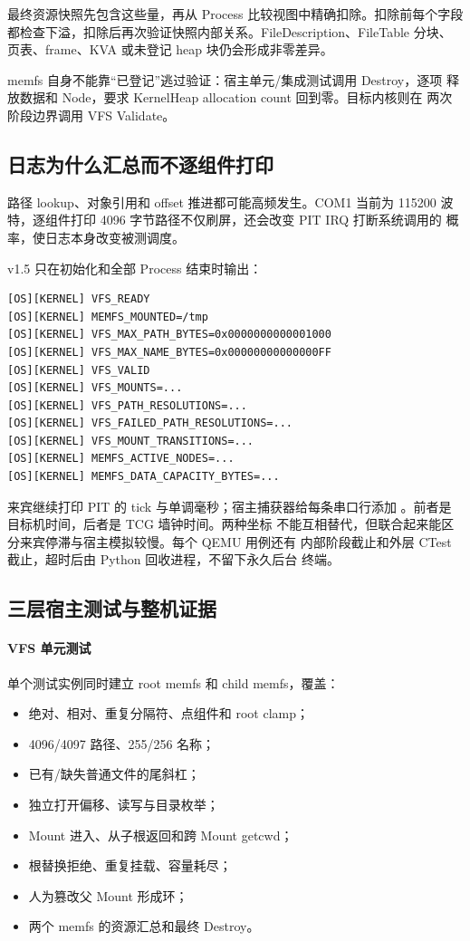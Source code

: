 最终资源快照先包含这些量，再从 Process 比较视图中精确扣除。扣除前每个字段
都检查下溢，扣除后再次验证快照内部关系。FileDescription、FileTable 分块、
页表、frame、KVA 或未登记 heap 块仍会形成非零差异。

memfs 自身不能靠“已登记”逃过验证：宿主单元/集成测试调用 Destroy，逐项
释放数据和 Node，要求 KernelHeap allocation count 回到零。目标内核则在
两次阶段边界调用 VFS Validate。

\subsection{日志为什么汇总而不逐组件打印}

路径 lookup、对象引用和 offset 推进都可能高频发生。COM1 当前为 115200
波特，逐组件打印 4096 字节路径不仅刷屏，还会改变 PIT IRQ 打断系统调用的
概率，使日志本身改变被测调度。

v1.5 只在初始化和全部 Process 结束时输出：

\begin{lstlisting}[caption={VFS 的有界阶段日志}]
[OS][KERNEL] VFS_READY
[OS][KERNEL] MEMFS_MOUNTED=/tmp
[OS][KERNEL] VFS_MAX_PATH_BYTES=0x0000000000001000
[OS][KERNEL] VFS_MAX_NAME_BYTES=0x00000000000000FF
[OS][KERNEL] VFS_VALID
[OS][KERNEL] VFS_MOUNTS=...
[OS][KERNEL] VFS_PATH_RESOLUTIONS=...
[OS][KERNEL] VFS_FAILED_PATH_RESOLUTIONS=...
[OS][KERNEL] VFS_MOUNT_TRANSITIONS=...
[OS][KERNEL] MEMFS_ACTIVE_NODES=...
[OS][KERNEL] MEMFS_DATA_CAPACITY_BYTES=...
\end{lstlisting}

来宾继续打印 PIT 的 tick 与单调毫秒；宿主捕获器给每条串口行添加
\code{[QEMU][T+...ms]}。前者是目标机时间，后者是 TCG 墙钟时间。两种坐标
不能互相替代，但联合起来能区分来宾停滞与宿主模拟较慢。每个 QEMU 用例还有
内部阶段截止和外层 CTest 截止，超时后由 Python 回收进程，不留下永久后台
终端。

\subsection{三层宿主测试与整机证据}

\paragraph{VFS 单元测试}

单个测试实例同时建立 root memfs 和 child memfs，覆盖：

\begin{itemize}
  \item 绝对、相对、重复分隔符、点组件和 root clamp；
  \item 4096/4097 路径、255/256 名称；
  \item 已有/缺失普通文件的尾斜杠；
  \item 独立打开偏移、读写与目录枚举；
  \item Mount 进入、从子根返回和跨 Mount getcwd；
  \item 根替换拒绝、重复挂载、容量耗尽；
  \item 人为篡改父 Mount 形成环；
  \item 两个 memfs 的资源汇总和最终 Destroy。
\end{itemize}

